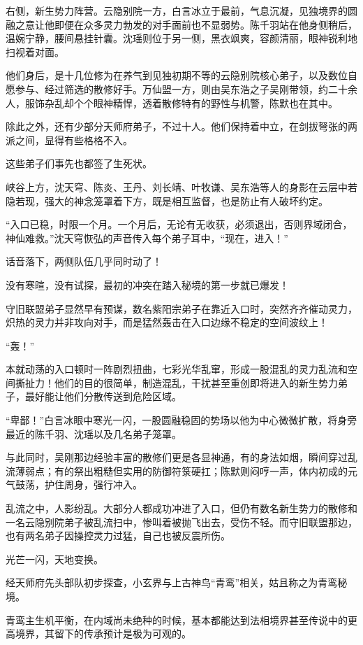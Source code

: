 右侧，新生势力阵营。云隐别院一方，白言冰立于最前，气息沉凝，见独境界的圆融之意让他即便在众多灵力勃发的对手面前也不显弱势。陈千羽站在他身侧稍后，温婉宁静，腰间悬挂针囊。沈瑶则位于另一侧，黑衣飒爽，容颜清丽，眼神锐利地扫视着对面。

他们身后，是十几位修为在养气到见独初期不等的云隐别院核心弟子，以及数位自愿参与、经过筛选的散修好手。万仙盟一方，则由吴东浩之子吴刚带领，约二十余人，服饰杂乱却个个眼神精悍，透着散修特有的野性与机警，陈默也在其中。

除此之外，还有少部分天师府弟子，不过十人。他们保持着中立，在剑拔弩张的两派之间，显得有些格格不入。

这些弟子们事先也都签了生死状。

峡谷上方，沈天穹、陈炎、王丹、刘长靖、叶牧谦、吴东浩等人的身影在云层中若隐若现，强大的神念笼罩着下方，既是相互监督，也是防止有人破坏约定。

“入口已稳，时限一个月。一个月后，无论有无收获，必须退出，否则界域闭合，神仙难救。”沈天穹恢弘的声音传入每个弟子耳中，“现在，进入！”

话音落下，两侧队伍几乎同时动了！

没有寒暄，没有试探，最初的冲突在踏入秘境的第一步就已爆发！

守旧联盟弟子显然早有预谋，数名紫阳宗弟子在靠近入口时，突然齐齐催动灵力，炽热的灵力并非攻向对手，而是猛然轰击在入口边缘不稳定的空间波纹上！

“轰！”

本就动荡的入口顿时一阵剧烈扭曲，七彩光华乱窜，形成一股混乱的灵力乱流和空间撕扯力！他们的目的很简单，制造混乱，干扰甚至重创即将进入的新生势力弟子，最好能让他们分散传送到危险区域。

“卑鄙！”白言冰眼中寒光一闪，一股圆融稳固的势场以他为中心微微扩散，将身旁最近的陈千羽、沈瑶以及几名弟子笼罩。

与此同时，吴刚那边经验丰富的散修们更是各显神通，有的身法如烟，瞬间穿过乱流薄弱点；有的祭出粗糙但实用的防御符箓硬扛；陈默则闷哼一声，体内初成的元气鼓荡，护住周身，强行冲入。

乱流之中，人影纷乱。大部分人都成功冲进了入口，但仍有数名新生势力的散修和一名云隐别院弟子被乱流扫中，惨叫着被抛飞出去，受伤不轻。而守旧联盟那边，也有两名弟子因操控灵力过猛，自己也被反震所伤。

\vspace{2em}

光芒一闪，天地变换。

经天师府先头部队初步探查，小玄界与上古神鸟“青鸾”相关，姑且称之为青鸾秘境。

青鸾主生机平衡，在内域尚未绝种的时候，基本都能达到法相境界甚至传说中的更高境界，其留下的传承预计是极为可观的。


